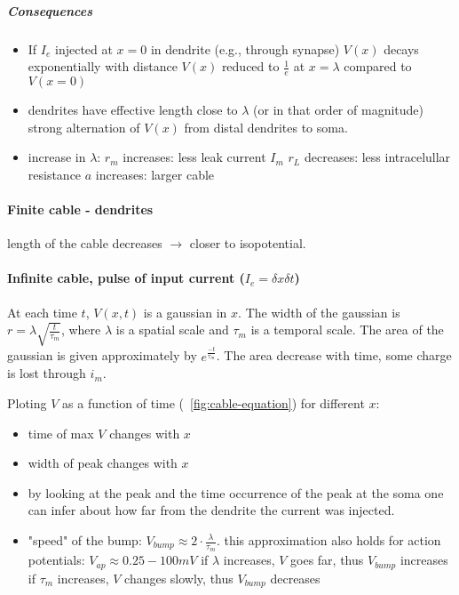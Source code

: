 \documentclass[main]{subfiles}
\begin{document}
\subparagraph{Consequences}
\begin{itemize}
\item  If $I_e$ injected at $x = 0$ in dendrite (e.g., through synapse)
\subitem $V(x)$ decays exponentially with distance
\subitem $V(x)$ reduced to $\frac{1}{e}$ at $x = \lambda$ compared to $V(x = 0)$
\item dendrites have effective length close to $\lambda$ (or in that order of magnitude)
\subitem strong alternation of $V(x)$ from distal dendrites to soma.
\item increase in $\lambda$:
\subitem $r_m$ increases: less leak current $I_m$
\subitem $r_L$ decreases: less intracelullar resistance
\subitem $a$ increases: larger cable
\end{itemize}

\paragraph{Finite cable - dendrites}
length of the cable decreases $\rightarrow$ closer to isopotential.

\paragraph{Infinite cable, pulse of input current ($I_e = \delta x \delta t$)}
At each time $t$, $V(x,t)$ is a gaussian in $x$.
The width of the gaussian is $r  = \lambda \sqrt{\frac{t}{\tau_m}}$, where $\lambda$ is a spatial scale and $\tau_m$ is a temporal scale.
The area of the gaussian is given approximately by $e^\frac{-t}{\tau_m}$. The area decrease with time, some charge is lost through $i_m$.

Ploting $V$ as a function of time (~\ref{fig:cable-equation}) for different $x$:
\begin{itemize}
\item time of max $V$ changes with $x$
\item width of peak changes with $x$
\item by looking at the peak and the time occurrence of the peak at the soma one can infer about how far from the dendrite the current was injected.
\item "speed" of the bump: $V_{bump} \approx 2 \cdot \frac{\lambda}{\tau_m}$.
\subitem this approximation also holds for action potentials: $V_{ap} \approx 0.25 -100 mV$
\subitem if $\lambda$ increases, $V$ goes far, thus $V_{bump}$ increases
\subitem if $\tau_m$ increases, $V$ changes slowly, thus $V_{bump}$ decreases
\end{itemize}
\end{document}

